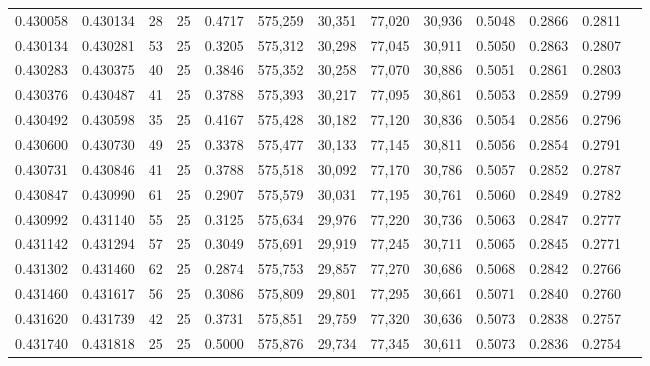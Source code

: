 \begin{tabular}{rrrrrrrrrrrrr}
0.430058 & 0.430134 &    28 &  25 &                                     0.4717 & 575,259 &  30,351 &  77,020 &  30,936 & 0.5048 & 0.2866 & 0.2811 \\
0.430134 & 0.430281 &    53 &  25 &                                     0.3205 & 575,312 &  30,298 &  77,045 &  30,911 & 0.5050 & 0.2863 & 0.2807 \\
0.430283 & 0.430375 &    40 &  25 &                                     0.3846 & 575,352 &  30,258 &  77,070 &  30,886 & 0.5051 & 0.2861 & 0.2803 \\
0.430376 & 0.430487 &    41 &  25 &                                     0.3788 & 575,393 &  30,217 &  77,095 &  30,861 & 0.5053 & 0.2859 & 0.2799 \\
0.430492 & 0.430598 &    35 &  25 &                                     0.4167 & 575,428 &  30,182 &  77,120 &  30,836 & 0.5054 & 0.2856 & 0.2796 \\
0.430600 & 0.430730 &    49 &  25 &                                     0.3378 & 575,477 &  30,133 &  77,145 &  30,811 & 0.5056 & 0.2854 & 0.2791 \\
0.430731 & 0.430846 &    41 &  25 &                                     0.3788 & 575,518 &  30,092 &  77,170 &  30,786 & 0.5057 & 0.2852 & 0.2787 \\
0.430847 & 0.430990 &    61 &  25 &                                     0.2907 & 575,579 &  30,031 &  77,195 &  30,761 & 0.5060 & 0.2849 & 0.2782 \\
0.430992 & 0.431140 &    55 &  25 &                                     0.3125 & 575,634 &  29,976 &  77,220 &  30,736 & 0.5063 & 0.2847 & 0.2777 \\
0.431142 & 0.431294 &    57 &  25 &                                     0.3049 & 575,691 &  29,919 &  77,245 &  30,711 & 0.5065 & 0.2845 & 0.2771 \\
0.431302 & 0.431460 &    62 &  25 &                                     0.2874 & 575,753 &  29,857 &  77,270 &  30,686 & 0.5068 & 0.2842 & 0.2766 \\
0.431460 & 0.431617 &    56 &  25 &                                     0.3086 & 575,809 &  29,801 &  77,295 &  30,661 & 0.5071 & 0.2840 & 0.2760 \\
0.431620 & 0.431739 &    42 &  25 &                                     0.3731 & 575,851 &  29,759 &  77,320 &  30,636 & 0.5073 & 0.2838 & 0.2757 \\
0.431740 & 0.431818 &    25 &  25 &                                     0.5000 & 575,876 &  29,734 &  77,345 &  30,611 & 0.5073 & 0.2836 & 0.2754 \\

\end{tabular}
